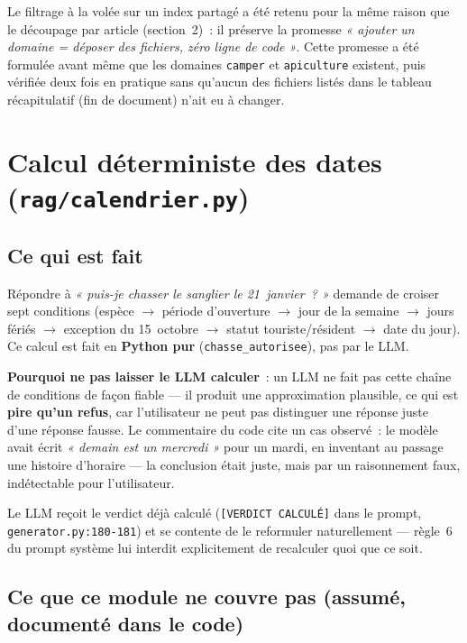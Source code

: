 \documentclass[11pt]{article}
\begin{document}
\vspace{0.5em}
Le filtrage à la volée sur un index partagé a été retenu pour la même raison que le découpage par
article (section~2)~: il préserve la promesse \textit{« ajouter un domaine = déposer des fichiers,
zéro ligne de code »}. Cette promesse a été formulée avant même que les domaines \texttt{camper} et
\texttt{apiculture} existent, puis vérifiée deux fois en pratique sans qu'aucun des fichiers listés
dans le tableau récapitulatif (fin de document) n'ait eu à changer.

\section{Calcul déterministe des dates (\texttt{rag/calendrier.py})}

\subsection*{Ce qui est fait}

Répondre à \textit{« puis-je chasser le sanglier le 21~janvier~? »} demande de croiser sept
conditions (espèce $\rightarrow$ période d'ouverture $\rightarrow$ jour de la semaine
$\rightarrow$ jours fériés $\rightarrow$ exception du 15~octobre $\rightarrow$ statut
touriste/résident $\rightarrow$ date du jour). Ce calcul est fait en \textbf{Python pur}
(\texttt{chasse\_autorisee}), pas par le LLM.

\textbf{Pourquoi ne pas laisser le LLM calculer}~: un LLM ne fait pas cette chaîne de conditions de
façon fiable --- il produit une approximation plausible, ce qui est \textbf{pire qu'un refus}, car
l'utilisateur ne peut pas distinguer une réponse juste d'une réponse fausse. Le commentaire du code
cite un cas observé~: le modèle avait écrit \textit{« demain est un mercredi »} pour un mardi, en
inventant au passage une histoire d'horaire --- la conclusion était juste, mais par un raisonnement
faux, indétectable pour l'utilisateur.

Le LLM reçoit le verdict déjà calculé (\texttt{[VERDICT CALCULÉ]} dans le prompt,
\texttt{generator.py:180-181}) et se contente de le reformuler naturellement --- règle~6 du prompt
système lui interdit explicitement de recalculer quoi que ce soit.

\subsection*{Ce que ce module ne couvre pas (assumé, documenté dans le code)}
\end{document}
